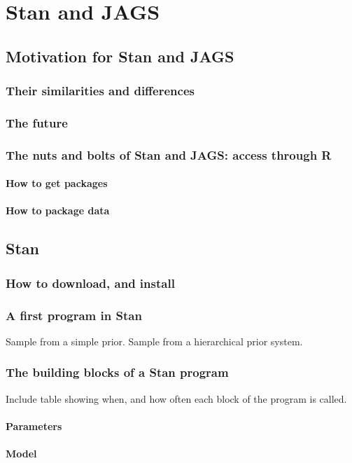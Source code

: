 \documentclass[11pt,fullpage]{book}
\begin{document}
\chapter{Stan and JAGS}
\section{Motivation for Stan and JAGS}
\subsection{Their similarities and differences}
\subsection{The future}

\subsection{The nuts and bolts of Stan and JAGS: access through R}
\subsubsection{How to get packages}
\subsubsection{How to package data}

\section{Stan}
\subsection{How to download, and install}
\subsection{A first program in Stan}
Sample from a simple prior. Sample from a hierarchical prior system.
\subsection{The building blocks of a Stan program}
Include table showing when, and how often each block of the program is called.
\subsubsection{Parameters}
\subsubsection{Model}
\end{document}

